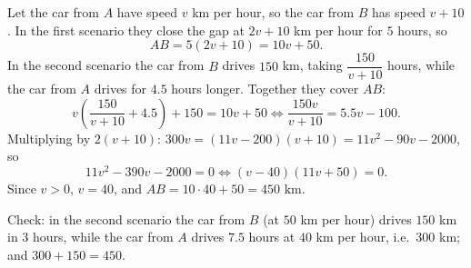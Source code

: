 Let the car from $A$ have speed $v$ km per hour, so the car from $B$ has speed $v+10$. In the first scenario they close the gap at $2v+10$ km per hour for $5$ hours, so
\[
AB=5(2v+10)=10v+50 .
\]
In the second scenario the car from $B$ drives $150$ km, taking $\dfrac{150}{v+10}$ hours, while the car from $A$ drives for $4.5$ hours longer. Together they cover $AB$:
\[
v\left(\dfrac{150}{v+10}+4.5\right)+150=10v+50\iff \dfrac{150v}{v+10}=5.5v-100 .
\]
Multiplying by $2(v+10)$: $300v=(11v-200)(v+10)=11v^2-90v-2000$, so
\[
11v^2-390v-2000=0\iff(v-40)(11v+50)=0 .
\]
Since $v>0$, $v=40$, and $AB=10\cdot40+50=\boxed{450\text{ km}}$.

Check: in the second scenario the car from $B$ (at $50$ km per hour) drives $150$ km in $3$ hours, while the car from $A$ drives $7.5$ hours at $40$ km per hour, i.e.\ $300$ km; and $300+150=450$.
